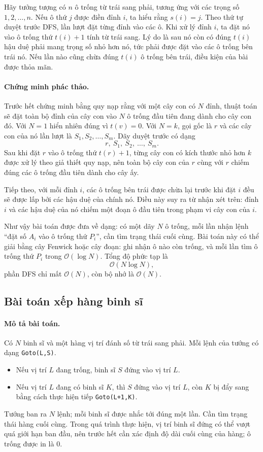 \documentclass[11pt]{article}
\newcommand{\Oh}{\mathcal{O}}
\begin{document}
Hãy tưởng tượng có $n$ ô trống từ trái sang phải, tương ứng với các trọng số
$1,2,\ldots,n$. Nếu ô thứ $j$ được điền đỉnh $i$, ta hiểu rằng $s(i)=j$.
Theo thứ tự duyệt trước DFS, lần lượt đặt từng đỉnh vào các ô. Khi xử lý đỉnh
$i$, ta đặt nó vào ô trống thứ $t(i)+1$ tính từ trái sang. Lý do là sau nó còn
có đúng $t(i)$ hậu duệ phải mang trọng số nhỏ hơn nó, tức phải được đặt vào
các ô trống bên trái nó. Nếu lần nào cũng chừa đúng $t(i)$ ô trống bên trái,
điều kiện của bài được thỏa mãn.

\paragraph{Chứng minh phác thảo.}
Trước hết chứng minh bằng quy nạp rằng với một cây con có $N$ đỉnh, thuật toán
sẽ đặt toàn bộ đỉnh của cây con vào $N$ ô trống đầu tiên đang dành cho cây con
đó. Với $N=1$ hiển nhiên đúng vì $t(v)=0$. Với $N=k$, gọi gốc là $r$ và các
cây con của nó lần lượt là $S_1,S_2,\ldots,S_m$. Dãy duyệt trước có dạng
\[
  r,\ S_1,\ S_2,\ \ldots,\ S_m.
\]
Sau khi đặt $r$ vào ô trống thứ $t(r)+1$, từng cây con có kích thước nhỏ hơn
$k$ được xử lý theo giả thiết quy nạp, nên toàn bộ cây con của $r$ cùng với
$r$ chiếm đúng các ô trống đầu tiên dành cho cây ấy.

Tiếp theo, với mỗi đỉnh $i$, các ô trống bên trái được chừa lại trước khi đặt
$i$ đều sẽ được lấp bởi các hậu duệ của chính nó. Điều này suy ra từ nhận xét
trên: đỉnh $i$ và các hậu duệ của nó chiếm một đoạn ô đầu tiên trong phạm vi
cây con của $i$.

Như vậy bài toán được đưa về dạng: có một dãy $N$ ô trống, mỗi lần nhận lệnh
``đặt số $A_i$ vào ô trống thứ $P_i$'', cần tìm trạng thái cuối cùng. Bài toán
này có thể giải bằng cây Fenwick hoặc cây đoạn: ghi nhận ô nào còn trống, và
mỗi lần tìm ô trống thứ $P_i$ trong $\Oh(\log N)$. Tổng độ phức tạp là
\[
  \Oh(N\log N),
\]
phần DFS chỉ mất $\Oh(N)$, còn bộ nhớ là $\Oh(N)$.

\subsection{Bài toán xếp hàng binh sĩ}

\paragraph{Mô tả bài toán.}
Có $N$ binh sĩ và một hàng vị trí đánh số từ trái sang phải. Mỗi lệnh của
tướng có dạng \texttt{Goto(L,S)}.
\begin{itemize}
  \item Nếu vị trí $L$ đang trống, binh sĩ $S$ đứng vào vị trí $L$.
  \item Nếu vị trí $L$ đang có binh sĩ $K$, thì $S$ đứng vào vị trí $L$, còn
  $K$ bị đẩy sang bằng cách thực hiện tiếp \texttt{Goto(L+1,K)}.
\end{itemize}
Tướng ban ra $N$ lệnh; mỗi binh sĩ được nhắc tới đúng một lần. Cần tìm trạng
thái hàng cuối cùng. Trong quá trình thực hiện, vị trí binh sĩ đứng có thể
vượt quá giới hạn ban đầu, nên trước hết cần xác định độ dài cuối cùng của
hàng; ô trống được in là $0$.
\end{document}
